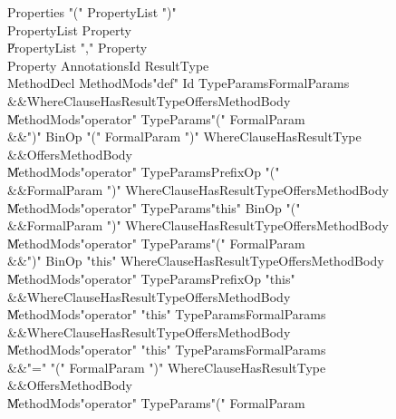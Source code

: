 \begin{grammar}

 Properties  \:   \xcd"("  PropertyList  \xcd")"\\
 PropertyList  \:   Property\\
    \|   PropertyList  \xcd","  Property\\
 Property  \:   Annotations\opt  Id  ResultType\\
 MethodDecl  \:   MethodMods\opt  \xcd"def"  Id  TypeParams\opt  FormalParams\\
          &&WhereClause\opt  HasResultType\opt  Offers\opt  MethodBody\\
    \|   MethodMods\opt  \xcd"operator"  TypeParams\opt  \xcd"("  FormalParam  \\
          &&\xcd")"  BinOp  \xcd"("  FormalParam    \xcd")"  WhereClause\opt  HasResultType\opt\\
          &&Offers\opt  MethodBody\\
    \|   MethodMods\opt  \xcd"operator"  TypeParams\opt  PrefixOp  \xcd"("\\
          &&FormalParam    \xcd")"  WhereClause\opt  HasResultType\opt  Offers\opt  MethodBody\\
    \|   MethodMods\opt  \xcd"operator"  TypeParams\opt  \xcd"this"  BinOp  \xcd"("\\
          &&FormalParam    \xcd")"  WhereClause\opt  HasResultType\opt  Offers\opt  MethodBody\\
    \|   MethodMods\opt  \xcd"operator"  TypeParams\opt  \xcd"("  FormalParam  \\
          &&\xcd")"  BinOp  \xcd"this"  WhereClause\opt  HasResultType\opt  Offers\opt  MethodBody\\
    \|   MethodMods\opt  \xcd"operator"  TypeParams\opt  PrefixOp  \xcd"this"\\
          &&WhereClause\opt  HasResultType\opt  Offers\opt  MethodBody\\
    \|   MethodMods\opt  \xcd"operator"  \xcd"this"  TypeParams\opt  FormalParams\\
          &&WhereClause\opt  HasResultType\opt  Offers\opt  MethodBody\\
    \|   MethodMods\opt  \xcd"operator"  \xcd"this"  TypeParams\opt  FormalParams\\
          &&\xcd"="  \xcd"("  FormalParam    \xcd")"  WhereClause\opt  HasResultType\opt\\
          &&Offers\opt  MethodBody\\
    \|   MethodMods\opt  \xcd"operator"  TypeParams\opt  \xcd"("  FormalParam  \\

\end{grammar}
